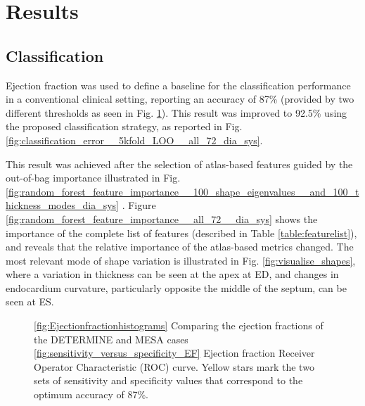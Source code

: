 \documentclass{llncs}
\begin{document}
\section{Results}
	\subsection{Classification}
Ejection fraction was used to define a baseline for the classification performance in a conventional clinical setting, reporting an accuracy of 87\% (provided by two different thresholds as seen in Fig. \ref{fig:EFs}). This result was improved to 92.5\% using the proposed classification strategy, as reported in Fig.    \ref{fig:classification_error__5kfold_LOO__all_72_dia_sys}. 

This result was achieved after the selection of atlas-based features guided by the out-of-bag importance illustrated in Fig. \ref{fig:random_forest_feature_importance__100_shape_eigenvalues__and_100_thickness_modes_dia_sys} . Figure \ref{fig:random_forest_feature_importance__all_72__dia_sys} shows the importance of the complete list of features (described in Table \ref{table:featurelist}), and reveals that the relative importance of the atlas-based metrics changed. The most relevant mode of shape variation is illustrated in Fig. \ref{fig:visualise_shapes}, where a variation in thickness can be seen at the apex at ED, and changes in endocardium curvature, particularly opposite the middle of the septum, can be seen at ES. 

		
		\begin{figure}[]
		\begin{center}
		
		

\caption{ \ref{fig:Ejectionfractionhistograms} Comparing the ejection fractions of the DETERMINE and MESA cases \ref{fig:sensitivity_versus_specificity_EF} Ejection fraction Receiver Operator Characteristic (ROC) curve. Yellow stars mark the two sets of sensitivity and specificity values that correspond to the optimum accuracy of 87\%.}
\label{fig:EFs}
  
\end{center}

		\end{figure}
\end{document}
